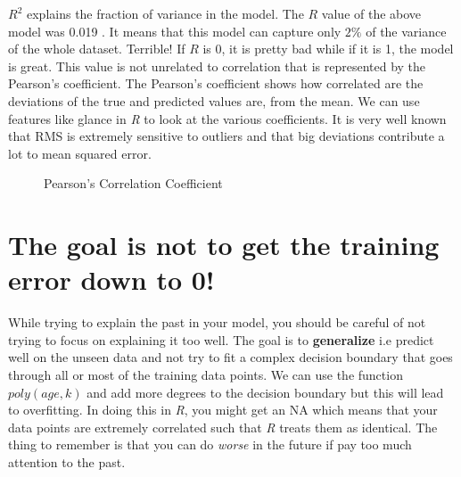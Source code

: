 $R^2$ explains the fraction of variance in the model. The $R$ value of the above model was 0.019 . It means that this model can capture only $2\%$ of the variance of the whole dataset. Terrible! If $R$ is 0, it is pretty bad while if it is 1, the model is great. This value is not unrelated to correlation that is represented by the Pearson's coefficient. The Pearson's coefficient shows how correlated are the deviations of the true and predicted values are, from the mean. We can use features like glance in \emph{R}
to look at the various coefficients. It is very well known that RMS is extremely sensitive to outliers and that big deviations contribute a lot to mean squared error. 

\begin{figure}[h]
\centering
\caption{Pearson's Correlation Coefficient}
{\setlength{\fboxsep}{20pt}
\setlength{\fboxrule}{1pt}
\textcolor{Magenta}{}
}
\end{figure} 

\newpage
\section{The goal is not to get the training error down to 0!}
While trying to explain the past in your model, you should be careful of not trying to focus on explaining it too well. The goal is to \textbf{generalize} i.e predict well on the unseen data and not try to fit a complex decision boundary that goes through all or most of the training data points. We can use the function $poly(age,k)$ and add more degrees to the decision boundary but this will lead to overfitting. In doing this in \emph{R}, you might get an NA which means that your data points are extremely correlated such that \emph{R} treats them as identical. The thing to remember is that you can do \emph{worse} in the future if pay too much attention to the past.

